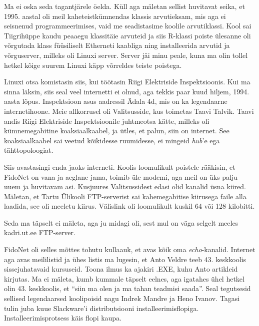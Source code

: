 Ma ei oska seda tagantjärele öelda. Küll aga mäletan sellist huvitavat seika, et 1995. aastal oli meil kaheteistkümnendas klassis
arvutieksam, mis aga ei seisnenud 
programmeerimises, vaid me seadistasime koolile
arvutiklassi. Kool sai Tiigrihüppe kaudu peaaegu 
klassitäie arvuteid ja siis R-klassi poiste ülesanne 
oli võrgutada klass 
füüsiliselt Etherneti kaabliga ning installeerida arvutid ja 
võrguserver, milleks oli Linuxi server. Server jäi minu peale, 
kuna ma olin tollel hetkel kõige suurem Linuxi käpp võrreldes 
teiste poistega.


Linuxi otsa komistasin siis, kui töötasin Riigi Elektriside 
Inspektsioonis. Kui ma sinna 
läksin, siis seal veel internetti ei olnud, aga tekkis paar kuud hiljem, 1994. aasta lõpus. 
Inspektsioon asus aadressil Ädala 4d, mis on ka 
legendaarne internetihoone. Meie allkorrusel oli 
Valitsusside, kus toimetas Taavi Talvik. Taavi andis Riigi Elektriside Inspektsioonile juhtmeotsa kätte, 
milleks oli kümnemegabitine koaksiaalkaabel, ja ütles, et palun, siin on 
internet. See koaksiaalkaabel sai veetud kõikidesse ruumidesse, ei mingeid 
\emph{hub}'e ega tähttopoloogiat.

Siis avastasingi enda jaoks interneti. Koolis loomulikult poistele rääkisin, et 
FidoNet on vana ja aeglane jama, toimib üle modemi, aga meil on 
üks palju uuem ja huvitavam asi. Kusjuures Valitsussidest edasi olid kanalid 
üsna kiired. Mäletan, et Tartu Ülikooli FTP-serverist sai kahemegabitise 
kiirusega faile alla laadida, see oli meeletu kiirus. Välislink oli 
loomulikult kuskil 64 või 128 kilobitti. 


Seda ma täpselt ei mäleta, aga ju midagi oli, sest mul on väga selgelt 
meeles kadri.ut.ee FTP-server. 

FidoNet oli selles mõttes tohutu kullaauk, et avas kõik oma 
\emph{echo}-kanalid. Internet aga avas meililistid ja ühes listis ma 
lugesin, et Anto Veldre teeb 43. 
keskkoolis 
sissejuhatavaid kursuseid. Toona ilmus ka ajakiri .EXE, 
kuhu Anto artikleid kirjutas. Ma ei mäleta, kumb kummale täpselt eelnes, aga 
igatahes ühel hetkel olin 43. keskkoolis, et 
\enquote{siin ma olen ja ma tahan teadmisi saada}. Seal tegutsesid  
sellised legendaarsed koolipoisid nagu Indrek Mandre ja Heno Ivanov. Tagasi tulin  
juba kuue Slackware'i distributsiooni installeerimisflopiga. Installeerimisprotsess käis flopi kaupa. 

